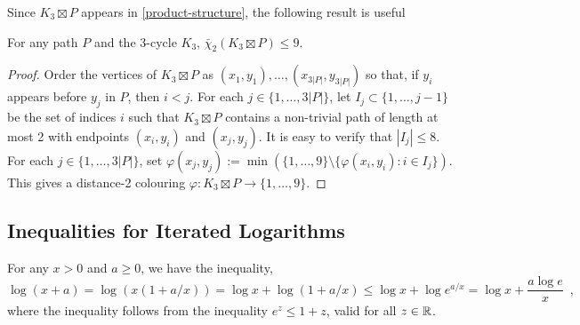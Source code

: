 \documentclass[kpfonts]{patmorin}
\newcommand{\dtcn}{\bar{\chi}_2}
\theoremstyle{named}
\begin{document}
%
%
%
%

Since $K_3\boxtimes P$ appears in \cref{product-structure}, the following result
is useful

\begin{lem}\label{dumb}
    For any path $P$ and the 3-cycle $K_3$, $\dtcn(K_3\boxtimes P)\le 9$.
\end{lem}

\begin{proof}
    Order the vertices of $K_3\boxtimes P$ as $(x_1,y_1),\ldots,(x_{3|P|},y_{3|P|})$ so that, if $y_i$ appears before $y_j$ in $P$, then $i<j$. For each $j\in\{1,\ldots,3|P|\}$, let $I_j\subset\{1,\ldots,j-1\}$ be the set of indices $i$ such that $K_3\boxtimes P$ contains a non-trivial path of length at most 2 with endpoints $(x_i,y_i)$ and $(x_j,y_j)$.  It is easy to verify that $|I_j|\le 8$.  For each $j\in\{1,\ldots,3|P|\}$, set $\varphi(x_j,y_j):=\min(\{1,\ldots,9\}\setminus\{\varphi(x_i,y_i):i\in I_j\})$.  This gives a distance-2 colouring $\varphi:K_3\boxtimes P\to\{1,\ldots,9\}$.
\end{proof}


\subsection{Inequalities for Iterated Logarithms}

For any $x> 0$ and $a\ge 0$, we have the inequality,
\begin{equation}
    \log (x+a) = \log (x(1+a/x)) = \log x + \log(1+a/x) \le \log x + \log e^{a/x} = \log x + \frac{a\log e}{x} \enspace , \label{log-x-plus-a}
\end{equation}
where the inequality follows from the inequality $e^z \le 1+z$, valid for all $z\in\mathbb{R}$.
\end{document}
